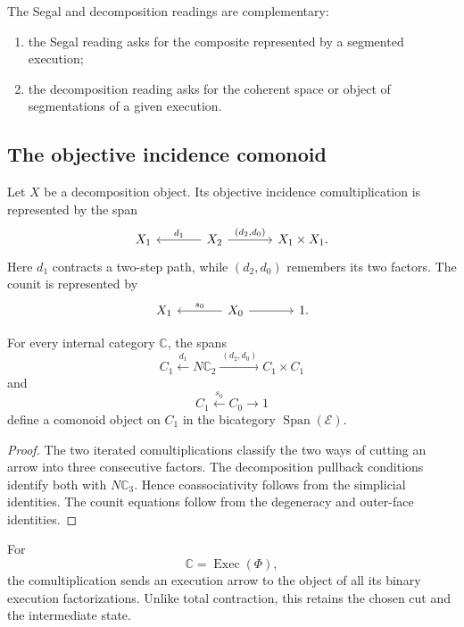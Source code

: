 The Segal and decomposition readings are complementary:
\begin{enumerate}
    \item the Segal reading asks for the composite represented by a segmented
    execution;
    \item the decomposition reading asks for the coherent space or object of
    segmentations of a given execution.
\end{enumerate}

\subsection{The objective incidence comonoid}
\label{subsec:objective-incidence-comonoid}

Let \(X\) be a decomposition object. Its objective incidence
comultiplication is represented by the span
\[
\begin{tikzcd}[column sep=large]
    X_1
    &
    X_2
        \arrow[l,"d_1"']
        \arrow[r,"{(d_2,d_0)}"]
    &
    X_1\times X_1.
\end{tikzcd}
\]
Here \(d_1\) contracts a two-step path, while \((d_2,d_0)\) remembers its
two factors. The counit is represented by
\[
\begin{tikzcd}[column sep=large]
    X_1
    &
    X_0
        \arrow[l,"s_0"']
        \arrow[r]
    &
    1.
\end{tikzcd}
\]

\begin{theorem}
\label{thm:execution-incidence-comonoid}
For every internal category \(\mathbb C\), the spans
\[
    C_1
    \xleftarrow{\ d_1\ }
    N\mathbb C_2
    \xrightarrow{\ (d_2,d_0)\ }
    C_1\times C_1
\]
and
\[
    C_1
    \xleftarrow{\ s_0\ }
    C_0
    \longrightarrow
    1
\]
define a comonoid object on \(C_1\) in the bicategory
\(\operatorname{Span}(\mathcal E)\).
\end{theorem}

\begin{proof}
The two iterated comultiplications classify the two ways of cutting an arrow
into three consecutive factors. The decomposition pullback conditions
identify both with \(N\mathbb C_3\). Hence coassociativity follows from the
simplicial identities. The counit equations follow from the degeneracy and
outer-face identities.
\end{proof}

For
\[
    \mathbb C=\operatorname{Exec}(\Phi),
\]
the comultiplication sends an execution arrow to the object of all its binary
execution factorizations. Unlike total contraction, this retains the chosen
cut and the intermediate state.

